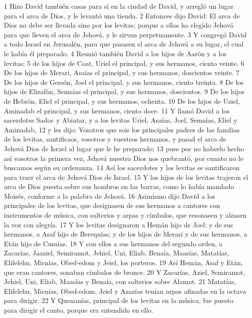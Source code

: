 1 Hizo David también casas para sí en la ciudad de David, y arregló un lugar para el arca de Dios, y le levantó una tienda.
2 Entonces dijo David: El arca de Dios no debe ser llevada sino por los levitas; porque a ellos ha elegido Jehová para que lleven el arca de Jehová, y le sirvan perpetuamente. 
3 Y congregó David a todo Israel en Jerusalén, para que pasasen el arca de Jehová a su lugar, el cual le había él preparado.
4 Reunió también David a los hijos de Aarón y a los levitas;
5 de los hijos de Coat, Uriel el principal, y sus hermanos, ciento veinte.
6 De los hijos de Merari, Asaías el principal, y sus hermanos, doscientos veinte.
7 De los hijos de Gersón, Joel el principal, y sus hermanos, ciento treinta.
8 De los hijos de Elizafán, Semaías el principal, y sus hermanos, doscientos.
9 De los hijos de Hebrón, Eliel el principal, y sus hermanos, ochenta.
10 De los hijos de Uziel, Aminadab el principal, y sus hermanos, ciento doce.
11 Y llamó David a los sacerdotes Sadoc y Abiatar, y a los levitas Uriel, Asaías, Joel, Semaías, Eliel y Aminadab,
12 y les dijo: Vosotros que sois los principales padres de las familias de los levitas, santificaos, vosotros y vuestros hermanos, y pasad el arca de Jehová Dios de Israel al lugar que le he preparado;
13 pues por no haberlo hecho así vosotros la primera vez, Jehová nuestro Dios nos quebrantó, por cuanto no le buscamos según su ordenanza.
14 Así los sacerdotes y los levitas se santificaron para traer el arca de Jehová Dios de Israel.
15 Y los hijos de los levitas trajeron el arca de Dios puesta sobre sus hombros en las barras, como lo había mandado Moisés, conforme a la palabra de Jehová. 
16 Asimismo dijo David a los principales de los levitas, que designasen de sus hermanos a cantores con instrumentos de música, con salterios y arpas y címbalos, que resonasen y alzasen la voz con alegría.
17 Y los levitas designaron a Hemán hijo de Joel; y de sus hermanos, a Asaf hijo de Berequías; y de los hijos de Merari y de sus hermanos, a Etán hijo de Cusaías.
18 Y con ellos a sus hermanos del segundo orden, a Zacarías, Jaaziel, Semiramot, Jehiel, Uni, Eliab, Benaía, Maasías, Matatías, Elifelehu, Micnías, Obed-edom y Jeiel, los porteros.
19 Así Hemán, Asaf y Etán, que eran cantores, sonaban címbalos de bronce.
20 Y Zacarías, Aziel, Semiramot, Jehiel, Uni, Eliab, Maasías y Benaía, con salterios sobre Alamot.
21 Matatías, Elifelehu, Micnías, Obed-edom, Jeiel y Azazías tenían arpas afinadas en la octava para dirigir.
22 Y Quenanías, principal de los levitas en la música, fue puesto para dirigir el canto, porque era entendido en ello.
